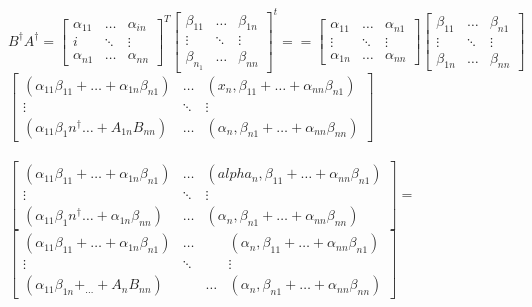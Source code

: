 \documentclass[12pt]{article}
\theoremstyle{plain}
\theoremstyle{nonumberplain}
\theoremstyle{plain}
\theoremstyle{nonumberplain}
\newcommand\1{{\bf 1}}
\newcommand{\<}{\left\langle}
\renewcommand{\>}{\right\rangle}
\begin{document}
\begin{enumerate}[label=(\alph*)]
$B^{\dagger}A^{\dagger}=\begin{bmatrix}
\alpha _{11} & \ldots  & \alpha _{in} \\
i & \ddots  & \vdots  \\
\alpha _{n1} & \ldots  & \alpha _{nn}
\end{bmatrix}^{T}\begin{bmatrix}
\beta _{11} & \ldots  & \beta _{1n} \\
\vdots  & \ddots  & \vdots  \\
\beta _{n_{1}} & \ldots  & \beta _{nn}
\end{bmatrix}^{t}==\begin{bmatrix}
\alpha _{11} & \ldots  & \alpha _{n1} \\
\vdots  & \ddots  & \vdots  \\
\alpha _{1n} & \ldots  & \alpha _{nn}
\end{bmatrix}\begin{bmatrix}
\beta _{11} & \ldots  & \beta _{n1} \\
\vdots  & \ddots  & \vdots  \\
\beta _{1n} & \ldots  & \beta _{nn}
\end{bmatrix}$\\$\begin{bmatrix}
\left( \alpha _{11}\beta _{11}+\ldots +\alpha _{1n}\beta _{n1}\right)  & \ldots  & \left( x_{n},\beta _{11}+\ldots +\alpha _{nn}\beta _{n1}\right)  \\
\vdots  & \ddots  & \vdots  \\
\left( \alpha _{11}\beta _{1}n^{\dagger}\ldots +A_{1n}B_{nn}\right)  & \ldots  & \left( \alpha _{n},\beta _{n1}+\ldots +\alpha _{nn}\beta _{nn}\right) 
\end{bmatrix}$\\\\$\begin{bmatrix}
\left( \alpha _{11}\beta _{11}+\ldots +\alpha _{1n}\beta _{n1}\right)  & \ldots  & \left( alpha_{n},\beta _{11}+\ldots +\alpha _{nn}\beta _{n1}\right)  \\
\vdots  & \ddots  & \vdots  \\
\left( \alpha _{11}\beta _{1}n^{\dagger}\ldots +\alpha _{1n}\beta _{nn}\right)  & \ldots  & \left( \alpha _{n},\beta _{n1}+\ldots +\alpha _{nn}\beta _{nn}\right) 
\end{bmatrix}=$\\$\begin{bmatrix}
\left( \alpha _{11}\beta _{11}+\ldots +\alpha _{1n}\beta _{n1}\right)  & \ldots  &  & \left( \alpha_{n},\beta _{11}+\ldots +\alpha _{nn}\beta _{n1}\right)  \\
\vdots  & \ddots  &  & \vdots  \\
\left( \alpha _{11}\beta _{1n}+_{\ldots }+A_{n}B_{nn}\right)  &  & \ldots  & \left( \alpha _{n},\beta _{n1}+\ldots +\alpha _{nn}\beta _{nn}\right) 
\end{bmatrix}$
\end{enumerate}
\end{document}
